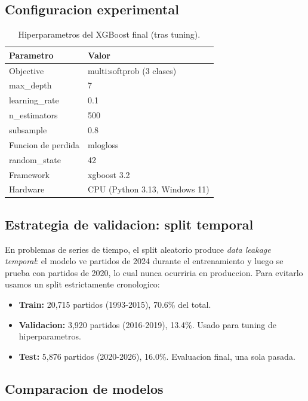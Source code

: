 \documentclass[10pt,twocolumn]{article}
\begin{document}
\subsection{Configuracion experimental}

\begin{table}[H]
\centering
\caption{Hiperparametros del XGBoost final (tras tuning).}
\label{tab:hparams}
\begin{tabularx}{\columnwidth}{lX}
\toprule
\textbf{Parametro} & \textbf{Valor} \\
\midrule
Objective & multi:softprob (3 clases) \\
max\_depth & 7 \\
learning\_rate & 0.1 \\
n\_estimators & 500 \\
subsample & 0.8 \\
Funcion de perdida & mlogloss \\
random\_state & 42 \\
Framework & xgboost 3.2 \\
Hardware & CPU (Python 3.13, Windows 11) \\
\bottomrule
\end{tabularx}
\end{table}

\subsection{Estrategia de validacion: split temporal}

En problemas de series de tiempo, el split aleatorio produce \textit{data leakage temporal}: el modelo ve partidos de 2024 durante el entrenamiento y luego se prueba con partidos de 2020, lo cual nunca ocurriria en produccion. Para evitarlo usamos un split estrictamente cronologico:

\begin{itemize}[leftmargin=*,topsep=2pt,itemsep=1pt]
  \item \textbf{Train:} 20,715 partidos (1993-2015), 70.6\% del total.
  \item \textbf{Validacion:} 3,920 partidos (2016-2019), 13.4\%. Usado para tuning de hiperparametros.
  \item \textbf{Test:} 5,876 partidos (2020-2026), 16.0\%. Evaluacion final, una sola pasada.
\end{itemize}

\subsection{Comparacion de modelos}
\end{document}
